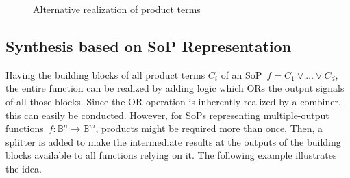 \documentclass[10pt,letterpaper,twoside,openright]{book}
\begin{document}
\begin{figure}[!h]
{}
\caption{Alternative realization of product terms}
\end{figure}

\subsection{Synthesis based on SoP Representation}
Having the building blocks of all product terms $C_{i}$ of an SoP~$f=C_1 \vee \dots \vee C_d$,
the entire function can be realized by adding logic which ORs the output signals of all those blocks.
Since the OR-operation is inherently realized by a combiner, this can easily be conducted.
However, for SoPs representing multiple-output functions~$f:\mathbb{B}^{n}\rightarrow\mathbb{B}^{m}$,
products might be required more than once. Then, a splitter is added to make the intermediate results at the outputs of the building blocks available to all functions relying on it. 
The following example illustrates the idea.
\end{document}
